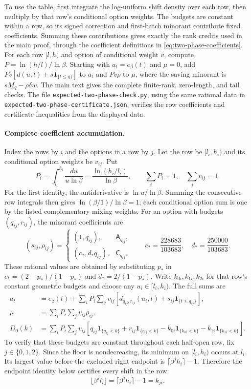 To use the table, first integrate the log-uniform shift density over
each row, then multiply by that row's conditional option weights.
The budgets are constant within a row, so its signed correction
and first-batch minorant contribute fixed coefficients. Summing
these contributions gives exactly the rank credits used in the
main proof, through the coefficient definitions in
\eqref{eq:two-phase-coefficients}.
For each row $[l,h)$ and option of conditional weight $v$, compute
$P=\ln(h/l)/\ln\beta$. Starting with $a_t=e_\beta(t)$ and $\mu=0$,
add $Pv[d(u,t)+s\mathbf1_{\{t\le q\}}]$ to $a_t$ and
$Pv\rho$ to $\mu$, where the saving minorant is
$sM_q-\rho\delta w$. The main text gives the complete finite-rank,
zero-length, and tail checks. The file
\texttt{expected-two-phase-}\allowbreak\texttt{check.py}, using the same rational data in
\texttt{expected-two-phase-}\allowbreak\texttt{certificate.json}, verifies the row
coefficients and certificate inequalities from the displayed data.

\paragraph{Complete coefficient accumulation.}
Index the rows by $i$ and the options in a row by $j$. Let the
row be $[l_i,h_i)$ and its conditional option weights be $v_{ij}$.
Put
\[
 P_i=\int_{l_i}^{h_i}\frac{du}{u\ln\beta}
     =\frac{\ln(h_i/l_i)}{\ln\beta},\qquad
 \sum_iP_i=1,\quad \sum_jv_{ij}=1.
\]
For the first identity, the antiderivative is $\ln u/\ln\beta$.
Summing the consecutive row integrals then gives
$\ln(\beta/1)/\ln\beta=1$; each conditional option sum is one by
the listed complementary mixing weights. For an option with
budgets $(q_{ij},r_{ij})$, the minorant coefficients are
\[
 (s_{ij},\rho_{ij})=
 \begin{cases}
 (1,q_{ij}),&\mathsf A_{q_{ij}},\\
 (c_*,d_*q_{ij}),&\mathsf C_{q_{ij}},
 \end{cases}
 \qquad c_*=\frac{228683}{103683},\quad d_*=\frac{250000}{103683}.
\]
These rational values are obtained by substituting $p_*$ in
$c_*=(2-p_*)/(1-p_*)$ and $d_*=2/(1-p_*)$.
Write $k_{0i},k_{1i},k_{2i}$ for that row's constant geometric
budgets and choose any $u_i\in[l_i,h_i)$. The full sums are
\[
 \begin{aligned}
 a_t&=e_\beta(t)+\sum_iP_i\sum_jv_{ij}
       \left[d_{q_{ij},r_{ij}}(u_i,t)
                       +s_{ij}\mathbf1_{\{t\le q_{ij}\}}\right],\\
 \mu&=\sum_iP_i\sum_jv_{ij}\rho_{ij},\\
 D_0(k)&=\sum_iP_i\sum_jv_{ij}
       \left[q_{ij}\mathbf1_{\{q_{ij}<k\}}
             +r_{ij}\mathbf1_{\{r_{ij}<k\}}
             -k_{0i}\mathbf1_{\{k_{0i}<k\}}
             -k_{1i}\mathbf1_{\{k_{1i}<k\}}\right].
 \end{aligned}
\]
To verify that these budgets are constant throughout each half-open
row, fix $j\in\{0,1,2\}$. Since the floor is nondecreasing, its minimum
on $[l_i,h_i)$ occurs at $l_i$. Its largest value before the excluded
right endpoint is $\lceil\beta^j h_i\rceil-1$. Therefore the endpoint
identity below certifies every shift in the row:
\[
 \lfloor\beta^j l_i\rfloor
   =\lceil\beta^j h_i\rceil-1=k_{ji}.
\]

